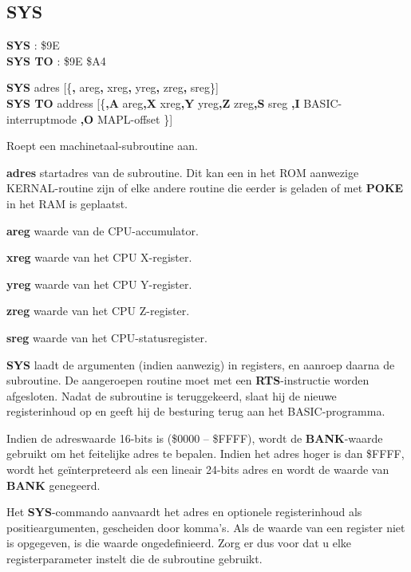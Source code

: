 
\newpage
\subsection{SYS}
\begin{description}[leftmargin=2cm,style=nextline]
\item [Token:]    {\bf SYS} : \$9E \\ {\bf SYS TO} : \$9E \$A4

\item [Formaat:]   {\bf SYS} adres [\{{\bf,} areg{\bf,} xreg{\bf,} yreg{\bf,} zreg{\bf,} sreg\}] \\                 {\bf SYS TO} address [\{{\bf,A} areg{\bf,X} xreg{\bf,Y} yreg{\bf,Z} zreg{\bf,S} sreg {\bf,I} BASIC-interruptmode {\bf,O} MAPL-offset \}]

\item [Gebruik:]    Roept een machinetaal-subroutine aan.

                  {\bf adres} startadres van de subroutine. Dit kan een in het ROM aanwezige KERNAL-routine zijn of elke andere routine die eerder is geladen of met {\bf POKE} in het RAM is geplaatst.

                  {\bf areg} waarde van de CPU-accumulator.

                  {\bf xreg} waarde van het CPU X-register.

                  {\bf yreg} waarde van het CPU Y-register.

                  {\bf zreg} waarde van het CPU Z-register.

                  {\bf sreg} waarde van het CPU-statusregister.

                  {\bf SYS} laadt de argumenten (indien aanwezig) in registers, en aanroep daarna de subroutine. De aangeroepen routine moet met een {\bf RTS}-instructie worden afgesloten. Nadat de subroutine is teruggekeerd, slaat hij de nieuwe registerinhoud op en geeft hij de besturing terug aan het BASIC-programma.

                  Indien de adreswaarde 16-bits is (\$0000 -- \$FFFF), wordt de {\bf BANK}-waarde gebruikt om het feitelijke adres te bepalen. Indien het adres hoger is dan \$FFFF, wordt het geïnterpreteerd als een lineair 24-bits adres en wordt de waarde van {\bf BANK} genegeerd.

\item [SYS-vorm:] Het {\bf SYS}-commando aanvaardt het adres en optionele registerinhoud als positieargumenten, gescheiden door komma's. Als de waarde van een register niet is opgegeven, is die waarde ongedefinieerd. Zorg er dus voor dat u elke registerparameter instelt die de subroutine gebruikt.


\end{description}
